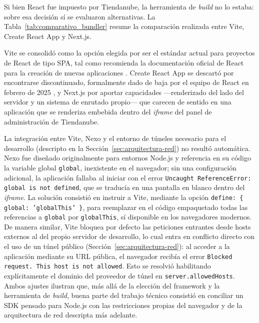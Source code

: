 Si bien React fue impuesto por Tiendanube, la herramienta de \emph{build} no lo estaba: sobre esa decisión sí se evaluaron alternativas. La Tabla~\ref{tab:comparativo_bundler} resume la comparación realizada entre Vite, Create React App y Next.js.

Vite se consolidó como la opción elegida por ser el estándar actual para proyectos de React de tipo SPA, tal como recomienda la documentación oficial de React para la creación de nuevas aplicaciones \parencite{ReactViteRecommendation2025}. Create React App se descartó por encontrarse discontinuado, formalmente dado de baja por el equipo de React en febrero de 2025 \parencite{ReactCRADeprecation2025}, y Next.js por aportar capacidades ---renderizado del lado del servidor y un sistema de enrutado propio--- que carecen de sentido en una aplicación que se renderiza embebida dentro del \emph{iframe} del panel de administración de Tiendanube.

La integración entre Vite, Nexo y el entorno de túneles necesario para el desarrollo (descripto en la Sección~\ref{sec:arquitectura-red}) no resultó automática. Nexo fue diseñado originalmente para entornos Node.js y referencia en su código la variable global \texttt{global}, inexistente en el navegador; sin una configuración adicional, la aplicación fallaba al iniciar con el error \texttt{Uncaught ReferenceError: global is not defined}, que se traducía en una pantalla en blanco dentro del \emph{iframe}. La solución consistió en instruir a Vite, mediante la opción \texttt{define: \{ global: 'globalThis' \}}, para reemplazar en el código empaquetado todas las referencias a \texttt{global} por \texttt{globalThis}, sí disponible en los navegadores modernos. De manera similar, Vite bloquea por defecto las peticiones entrantes desde hosts externos al del propio servidor de desarrollo, lo cual entra en conflicto directo con el uso de un túnel público (Sección~\ref{sec:arquitectura-red}): al acceder a la aplicación mediante su URL pública, el navegador recibía el error \texttt{Blocked request. This host is not allowed}. Esto se resolvió habilitando explícitamente el dominio del proveedor de túnel en \texttt{server.allowedHosts}. Ambos ajustes ilustran que, más allá de la elección del framework y la herramienta de \emph{build}, buena parte del trabajo técnico consistió en conciliar un SDK pensado para Node.js con las restricciones propias del navegador y de la arquitectura de red descripta más adelante.

